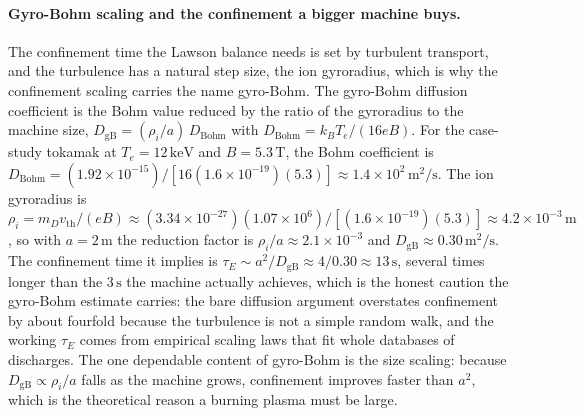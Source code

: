\paragraph{Gyro-Bohm scaling and the confinement a bigger machine buys.}
The confinement time the Lawson balance needs is set by turbulent transport,
and the turbulence has a natural step size, the ion gyroradius, which is why
the confinement scaling carries the name gyro-Bohm. The gyro-Bohm diffusion
coefficient is the Bohm value reduced by the ratio of the gyroradius to the
machine size, $D_{\mathrm{gB}} = (\rho_i/a)\,D_{\mathrm{Bohm}}$ with
$D_{\mathrm{Bohm}} = k_B T_e/(16 e B)$. For the case-study tokamak at $T_e =
12\,\si{\kilo\electronvolt}$ and $B = 5.3\,\si{\tesla}$, the Bohm coefficient
is $D_{\mathrm{Bohm}} = (1.92\times 10^{-15})/[16(1.6\times 10^{-19})(5.3)]
\approx 1.4\times 10^{2}\,\si{\meter\squared\per\second}$. The ion gyroradius is $\rho_i =
m_D v_{\mathrm{th}}/(eB) \approx (3.34\times 10^{-27})(1.07\times 10^{6})/
[(1.6\times 10^{-19})(5.3)] \approx 4.2\times 10^{-3}\,\si{\meter}$, so with
$a = 2\,\si{\meter}$ the reduction factor is $\rho_i/a \approx 2.1\times
10^{-3}$ and $D_{\mathrm{gB}} \approx 0.30\,\si{\meter\squared\per
\second}$. The confinement time it implies is $\tau_E \sim a^{2}/D_{\mathrm{gB}}
\approx 4/0.30 \approx 13\,\si{\second}$, several times
longer than the $3\,\si{\second}$ the machine actually achieves, which is the
honest caution the gyro-Bohm estimate carries: the bare diffusion argument
overstates confinement by about fourfold because the turbulence is not a
simple random walk, and the working $\tau_E$ comes from empirical scaling laws
that fit whole databases of discharges. The one dependable content of gyro-Bohm is
the size scaling: because $D_{\mathrm{gB}}\propto\rho_i/a$ falls as the machine
grows, confinement improves faster than $a^{2}$, which is the theoretical
reason a burning plasma must be large.

